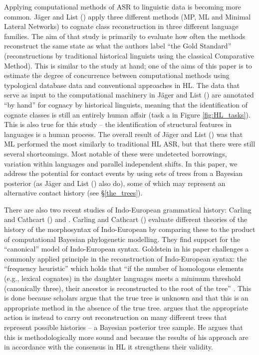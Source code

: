 \documentclass[12pt,letterpaper]{article}
\begin{document}
Applying computational methods of ASR to linguistic data is becoming more common. J\"ager and List (\citeyear{jager2018using}) apply three different methods (MP, ML and Minimal Lateral Networks) to cognate class reconstruction in three different language families. The aim of that study is primarily to evaluate how often the methods reconstruct the same state as what the authors label ``the Gold Standard'' (reconstructions by traditional historical linguists using the classical Comparative Method). This is similar to the study at hand; one of the aims of this paper is to estimate the degree of concurrence between computational methods using typological database data and conventional approaches in HL. The data that serve as input to the computational machinery in J\"ager and List (\citeyear{jager2018using}) are annotated ``by hand'' for cognacy by historical linguists, meaning that the identification of cognate classes is still an entirely human affair (task a in Figure \ref{fig:HL_tasks}). This is also true for this study -- the identification of structural features in languages is a human process. The overall result of J\"ager and List (\citeyear{jager2018using}) was that ML performed the most similarly to traditional HL ASR, but that there were still several shortcomings. Most notable of these were undetected borrowings, variation within languages and parallel independent shifts. In this paper, we address the potential for contact events by using sets of trees from a Bayesian posterior (as J\"ager and List (\citeyear{jager2018using}) also do), some of which may represent an alternative contact history (see §\ref{the_trees}).

There are also two recent studies of Indo-European grammatical history: Carling and Cathcart (\citeyear{carling2021reconstructing}) and \citet{goldstein_2022}. Carling and Cathcart (\citeyear{carling2021reconstructing}) evaluate different theories of the history of the morphosyntax of Indo-European by comparing these to the product of computational Bayesian phylogenetic modelling. They find support for the ``canonical'' model of Indo-European syntax. Goldstein in his paper challenges a commonly applied principle in the reconstruction of Indo-European syntax: the ``frequency heuristic'' which holds that ``if the number of homologous elements (e.g., lexical cognates) in the daughter languages meets a minimum threshold (canonically three), their ancestor is reconstructed to the root of the tree'' \citep[1/71]{goldstein_2022}. This is done because scholars argue that the true tree is unknown and that this is an appropriate method in the absence of the true tree. \citeauthor{goldstein_2022} argues that the appropriate action is instead to carry out reconstruction on many different trees that represent possible histories -- a Bayesian posterior tree sample. He argues that this is methodologically more sound and because the results of his approach are in accordance with the consensus in HL it strengthens their validity.
\end{document}
